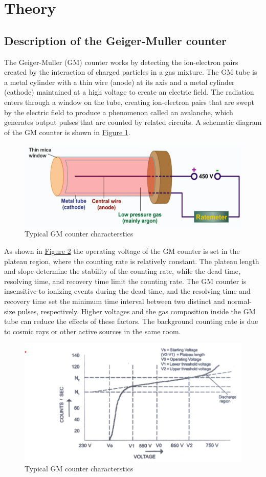 \section{Theory}
	\subsection{Description of the Geiger-Muller counter}
		The Geiger-Muller (GM) counter works by detecting the ion-electron pairs created by the interaction of charged particles in a gas mixture. The GM tube is a metal cylinder with a thin wire (anode) at its axis and a metal cylinder (cathode) maintained at a high voltage to create an electric field. The radiation enters through a window on the tube, creating ion-electron pairs that are swept by the electric field to produce a phenomenon called an avalanche, which generates output pulses that are counted by related circuits. A schematic diagram of the GM counter is shown in \hyperref[fig:th1]{Figure 1}.

		\begin{figure}[h]
			\centering
			\includegraphics[width=0.8\linewidth]{images/th2.png}
			\caption{Typical GM counter characterstics}
			\label{fig:th1}
		\end{figure}
		
		As shown in \hyperref[fig:th2]{Figure 2} the operating voltage of the GM counter is set in the plateau region, where the counting rate is relatively constant. The plateau length and slope determine the stability of the counting rate, while the dead time, resolving time, and recovery time limit the counting rate. The GM counter is insensitive to ionizing events during the dead time, and the resolving time and recovery time set the minimum time interval between two distinct and normal-size pulses, respectively. Higher voltages and the gas composition inside the GM tube can reduce the effects of these factors. The background counting rate is due to cosmic rays or other active sources in the same room.

		\begin{figure}[h]
			\centering
			\includegraphics[width=0.8\linewidth]{images/th1.png}
			\caption{Typical GM counter characterstics}
			\label{fig:th2}
		\end{figure}
	
